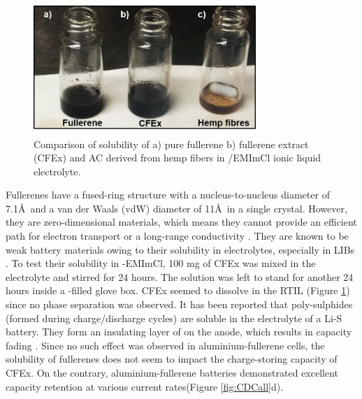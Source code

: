 \documentclass{article}
\begin{document}


\begin{figure}[h!]
\centering
\includegraphics[width=0.75\textwidth]{fig/CFExsol}
\caption{Comparison of solubility of a) pure  fullerene b) fullerene extract (CFEx) and AC derived from hemp fibers in /EMImCl ionic liquid electrolyte.}
\label{fig:CFExsol}
\end{figure}

Fullerenes have a fused-ring structure with a nucleus-to-nucleus diameter of 7.1\AA\ and a van der Waals (vdW) diameter of 11\AA\ in a single crystal. However, they are zero-dimensional materials, which means they cannot provide an efficient path for electron transport or a long-range conductivity \cite{loutfy_fullerene_2002, winkler_two-component_2007}. They are known to be weak battery materials owing to their solubility in electrolytes, especially in LIBs \cite{seger_prospects_1991}. To test their solubility in -EMImCl, 100 mg of CFEx was mixed in the electrolyte and stirred for 24 hours. The solution was left to stand for another 24 hours inside a -filled glove box. CFEx seemed to dissolve in the RTIL (Figure \ref{fig:CFExsol}) since no phase separation was observed. It has been reported that poly-sulphides (formed during charge/discharge cycles) are soluble in the electrolyte of a Li-S battery. They form an insulating layer of  on the anode, which results in capacity fading \cite{sun_effect_2017}. Since no such effect was observed in aluminium-fullerene cells, the solubility of fullerenes does not seem to impact the charge-storing capacity of CFEx. On the contrary, aluminium-fullerene batteries demonstrated excellent capacity retention at various current rates(Figure \ref{fig:CDCall}d).   
\end{document}
